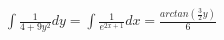 \documentclass[preview]{standalone}
\begin{document}
\begin{align*}
\int \frac{1}{4+9y^2} dy = \int \frac{1}{e^{2x+1}}dx = \frac{arctan(\frac{3}{2} y)}{6}
\end{align*}
\end{document}
